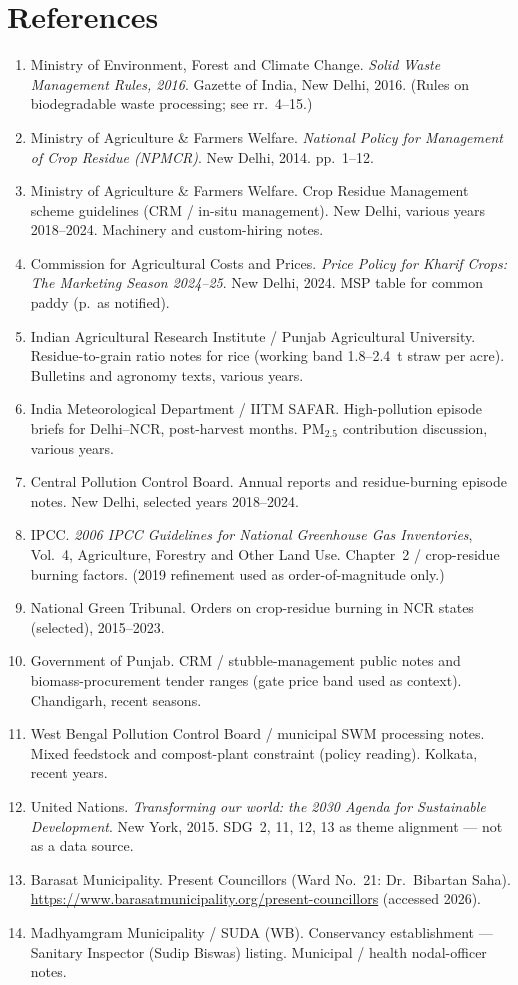\documentclass[12pt,a4paper]{article}
\begin{document}
\section{References}
\begin{enumerate}[leftmargin=1.5em,itemsep=0.35em]
  \item Ministry of Environment, Forest and Climate Change. \textit{Solid Waste Management Rules, 2016}. Gazette of India, New Delhi, 2016. (Rules on biodegradable waste processing; see rr.\ 4--15.)
  \item Ministry of Agriculture \& Farmers Welfare. \textit{National Policy for Management of Crop Residue (NPMCR)}. New Delhi, 2014. pp.\ 1--12.
  \item Ministry of Agriculture \& Farmers Welfare. Crop Residue Management scheme guidelines (CRM / in-situ management). New Delhi, various years 2018--2024. Machinery and custom-hiring notes.
  \item Commission for Agricultural Costs and Prices. \textit{Price Policy for Kharif Crops: The Marketing Season 2024--25}. New Delhi, 2024. MSP table for common paddy (p.\ as notified).
  \item Indian Agricultural Research Institute / Punjab Agricultural University. Residue-to-grain ratio notes for rice (working band 1.8--2.4~t straw per acre). Bulletins and agronomy texts, various years.
  \item India Meteorological Department / IITM SAFAR. High-pollution episode briefs for Delhi--NCR, post-harvest months. PM$_{2.5}$ contribution discussion, various years.
  \item Central Pollution Control Board. Annual reports and residue-burning episode notes. New Delhi, selected years 2018--2024.
  \item IPCC. \textit{2006 IPCC Guidelines for National Greenhouse Gas Inventories}, Vol.~4, Agriculture, Forestry and Other Land Use. Chapter~2 / crop-residue burning factors. (2019 refinement used as order-of-magnitude only.)
  \item National Green Tribunal. Orders on crop-residue burning in NCR states (selected), 2015--2023.
  \item Government of Punjab. CRM / stubble-management public notes and biomass-procurement tender ranges (gate price band used as context). Chandigarh, recent seasons.
  \item West Bengal Pollution Control Board / municipal SWM processing notes. Mixed feedstock and compost-plant constraint (policy reading). Kolkata, recent years.
  \item United Nations. \textit{Transforming our world: the 2030 Agenda for Sustainable Development}. New York, 2015. SDG~2, 11, 12, 13 as theme alignment --- not as a data source.
  \item Barasat Municipality. Present Councillors (Ward No.~21: Dr.\ Bibartan Saha). \url{https://www.barasatmunicipality.org/present-councillors} (accessed 2026).
  \item Madhyamgram Municipality / SUDA (WB). Conservancy establishment --- Sanitary Inspector (Sudip Biswas) listing. Municipal / health nodal-officer notes.
\end{enumerate}
\end{document}

